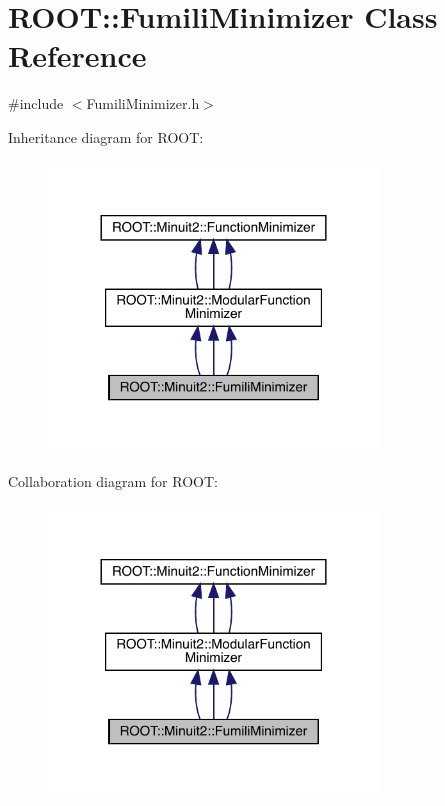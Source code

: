 \hypertarget{classROOT_1_1Minuit2_1_1FumiliMinimizer}{}\section{R\+O\+OT\+:\+:Fumili\+Minimizer Class Reference}
\label{classROOT_1_1Minuit2_1_1FumiliMinimizer}


{\ttfamily \#include $<$Fumili\+Minimizer.\+h$>$}



Inheritance diagram for R\+O\+OT\+:
\nopagebreak
\begin{figure}[H]
\begin{center}
\leavevmode
\includegraphics[width=248pt]{d7/d78/classROOT_1_1Minuit2_1_1FumiliMinimizer__inherit__graph}
\end{center}
\end{figure}


Collaboration diagram for R\+O\+OT\+:
\nopagebreak
\begin{figure}[H]
\begin{center}
\leavevmode
\includegraphics[width=248pt]{d6/d10/classROOT_1_1Minuit2_1_1FumiliMinimizer__coll__graph}
\end{center}
\end{figure}
